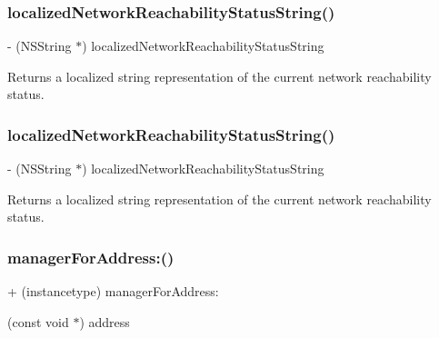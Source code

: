 \subsubsection{\texorpdfstring{localized\+Network\+Reachability\+Status\+String()}{localizedNetworkReachabilityStatusString()}\hspace{0.1cm}{\footnotesize\ttfamily [2/3]}}
{\footnotesize\ttfamily -\/ (N\+S\+String $\ast$) localized\+Network\+Reachability\+Status\+String \begin{DoxyParamCaption}{ }\end{DoxyParamCaption}}

Returns a localized string representation of the current network reachability status. \mbox{\label{interface_a_f_network_reachability_manager_afe6a32b5ab75661a802e6bbefaa74e2d}} 
\subsubsection{\texorpdfstring{localized\+Network\+Reachability\+Status\+String()}{localizedNetworkReachabilityStatusString()}\hspace{0.1cm}{\footnotesize\ttfamily [3/3]}}
{\footnotesize\ttfamily -\/ (N\+S\+String $\ast$) localized\+Network\+Reachability\+Status\+String \begin{DoxyParamCaption}{ }\end{DoxyParamCaption}}

Returns a localized string representation of the current network reachability status. \mbox{\label{interface_a_f_network_reachability_manager_abcf59bed68830fd7440310b3772022f4}} 
\subsubsection{\texorpdfstring{manager\+For\+Address\+:()}{managerForAddress:()}\hspace{0.1cm}{\footnotesize\ttfamily [1/3]}}
{\footnotesize\ttfamily + (instancetype) manager\+For\+Address\+: \begin{DoxyParamCaption}\item[{(const void $\ast$)}]{address }\end{DoxyParamCaption}}

